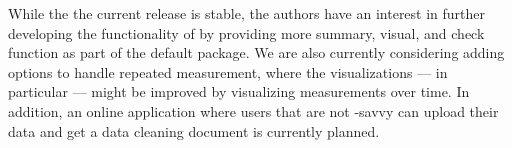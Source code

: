 \documentclass[article,shortnames]{jss}
\newcommand{\hl}[1]{\textcolor{magenta}{#1}}
\begin{document}
While the the current release is stable, the authors have an interest
in further developing the functionality of  by providing
more summary, visual, and check function as part of the default
package. We are also currently considering adding options to handle
repeated measurement, where the visualizations --- in particular ---
might be improved by visualizing measurements over time. In addition,
an online  \citep{shiny} application where users that are not
-savvy can upload their data and get a data cleaning
document is currently planned.




% 



\appendix
\newpage

% 








\end{document}
